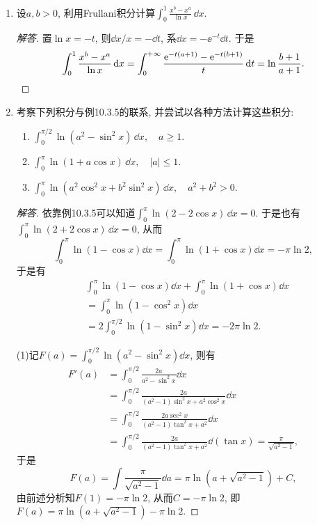 \begin{a}
\begin{enumerate}
\begin{proof}[解答]
\end{proof}
\item 设\(a,b>0\), 利用Frullani积分计算\(\int_{0}^{1}\frac{x^b-x^a}{\ln x}\,\dd x\).
\begin{proof}[解答]
置\(\ln x=-t\), 则\(\dd x/x=-\dd t\), 系\(\dd x=-\ee^{-t}\dd t\). 于是
\[\int_{0}^{1}\frac{x^b-x^a}{\ln x}\,{\rm d} x
=\int_{0}^{+\infty}\frac{{\rm e}^{-t(a+1)}-{\rm e}^{-t(b+1)}}{t}\,{\rm d} t
=\ln\frac{b+1}{a+1}.\qedhere\]
\end{proof}
\item 考察下列积分与例10.3.5的联系, 并尝试以各种方法计算这些积分:
\begin{enumerate}[label=(\arabic*)]
\item \(\int_{0}^{\pi/2}\ln(a^2-\sin^2x)\,\dd x,\quad a\geqslant 1.\)
\item \(\int_{0}^{\pi}\ln(1+a\cos x)\,\dd x,\quad |a|\leqslant 1\).
\item \(\int_{0}^{\pi}\ln(a^2\cos^2 x+b^2\sin^2x)\,\dd x,\quad a^2+b^2>0.\)
\end{enumerate}
\begin{proof}[解答]
依靠例10.3.5可以知道\(\int_{0}^{\pi}\ln(2-2\cos x)\,\dd x=0\). 
于是也有\(\int_{0}^{\pi}\ln(2+2\cos x)\,\dd x=0\), 从而
\[\int_{0}^{\pi}\ln\left(1-\cos x\right)\dd x
=\int_{0}^{\pi}\ln\left(1+\cos x\right)\dd x=-\pi\ln 2,\]
于是有\[\begin{split}
&\int_{0}^{\pi}\ln\left(1-\cos x\right)\dd x+\int_{0}^{\pi}\ln\left(1+\cos x\right)\dd x\\
&=\int_{0}^{\pi}\ln\left(1-\cos^2x\right)\dd x\\
&=2\int_{0}^{\pi/2}\ln\left(1-\sin^2x\right)\dd x=-2\pi\ln 2.
\end{split}\]

(1)记\(F(a)=\int_{0}^{\pi/2}\ln\left(a^2-\sin^2x\right)\dd x\), 则有
\[\begin{split}
F'(a)&=\int_{0}^{\pi/2}\frac{2a}{a^2-\sin^2x}\dd x\\
&=\int_{0}^{\pi/2}\frac{2a}{(a^2-1)\sin^2x+a^2\cos^2x}\dd x\\
&=\int_{0}^{\pi/2}\frac{2a\sec^2x}{(a^2-1)\tan^2x+a^2}\dd x\\
&=\int_{0}^{\pi/2}\frac{2a}{(a^2-1)\tan^2x+a^2}\dd\left(\tan x\right)
=\frac{\pi}{\sqrt{a^2-1}},
\end{split}\]于是
\[F(a)=\int\frac{\pi}{\sqrt{a^2-1}}\dd a=\pi\ln(a+\sqrt{a^2-1})+C,\]
由前述分析知\(F(1)=-\pi\ln 2\), 从而\(C=-\pi\ln 2\), 
即\(F(a)=\pi\ln\left(a+\sqrt{a^2-1}\right)-\pi\ln 2\).


\end{proof}
\end{enumerate}
\end{a}
